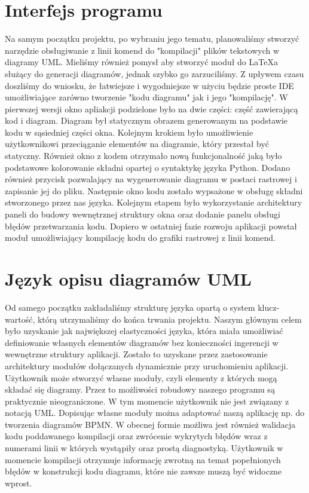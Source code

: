 \section{Interfejs programu}
Na samym początku projektu, po wybraniu jego tematu, planowaliśmy stworzyć narzędzie obsługiwanie z linii komend do "kompilacji" plików tekstowych w diagramy UML. Mieliśmy również pomysł aby stworzyć moduł do LaTeXa służący do generacji diagramów, jednak szybko go zarzuciliśmy.
Z upływem czasu doszliśmy do wniosku, że łatwiejsze i wygodniejsze w użyciu będzie proste IDE umożliwiające zarówno tworzenie "kodu diagramu" jak i jego "kompilację". W pierwszej wersji okno apliakcji podzielone było na dwie części: część zawierającą kod i diagram. Diagram był statycznym obrazem generowanym na podstawie kodu w sąsiedniej części okna.
Kolejnym krokiem było umożliwienie użytkownikowi przeciąganie elementów na diagramie, który przestał być statyczny. Również okno z kodem otrzymało nową funkcjonalność jaką było podstawowe kolorowanie składni opartej o syntaktykę języka Python. Dodano również przycisk pozwalający na wygenerowanie diagramu w postaci rastrowej i zapisanie jej do pliku.
Następnie okno kodu zostało wypsażone w obsługę składni stworzonego przez nas języka. Kolejnym etapem było wykorzystanie architektury paneli do budowy wewnętrznej struktury okna oraz dodanie panelu obsługi błędów przetwarzania kodu. Dopiero w ostatniej fazie rozwoju aplikacji powstał moduł umożliwiający kompilację kodu do grafiki rastrowej z linii komend.
\section{Język opisu diagramów UML}
Od samego początku zakładaliśmy strukturę języka opartą o system klucz-wartość, którą utrzymaliśmy do końca trwania projektu. Naszym głównym celem było uzyskanie jak największej elastyczności języka, która miała umożliwiać definiowanie własnych elementów diagramów bez konieczności ingerencji w wewnętrzne struktury aplikacji. Zostało to uzyskane przez zastosowanie architektury modułów dołączanych dynamicznie przy uruchomieniu aplikacji. Użytkownik może stworzyć własne moduły, czyli elementy z których mogą składać się diagramy. Przez to możliwości robudowy naszego programu są praktycznie nieograniczone. W tym momencie użytkownik nie jest związany z notacją UML. Dopisując własne moduły można adaptować naszą aplikację np. do tworzenia diagramów BPMN.
W obecnej formie możliwa jest również walidacja kodu poddawanego kompilacji oraz zwrócenie wykrytych błędów wraz z numerami linii w których wystąpiły oraz prostą diagnostyką. Użytkownik w momencie kompilacji otrzymuje informację zwrotną na temat popełnionych błędów w konstrukcji kodu diagramu, które nie zawsze muszą być widoczne wprost.
